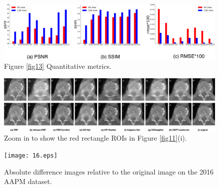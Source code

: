 \documentclass[lettersize,journal]{IEEEtran}
\begin{document}
\begin{figure}[!t]
	\centering
	\includegraphics[width=6.5in]{14.eps}
	\caption{Figure \ref{fig13} Quantitative metrics.}
	\label{fig14}
\end{figure}
\begin{figure}[!t]
	\centering
	\includegraphics[width=6.5in]{15.eps}
	\caption{Zoom in to show the red rectangle ROIs in Figure \ref{fig11}(i).}
	\label{fig15}
\end{figure}
\begin{figure}[!t]
	\centering
	\texttt{[image: 16.eps]}
	\caption{Absolute difference images relative to the original image on the 2016 AAPM dataset.}
	\label{fig16}
\end{figure}
\end{document}
